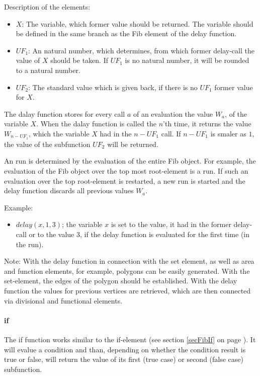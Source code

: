\bigskip\noindent
Description of the elements:
\begin{itemize}
 \item $X$: The variable, which former value should be returned. The variable should be defined in the same branch as the Fib element of the delay function.
 \item $UF_1$: An natural number, which determines, from which former delay-call the value of $X$ should be taken. If $UF_1$ is no natural number, it will be rounded to a natural number.
 \item $UF_2$: The standard value which is given back, if there is no $UF_1$ former value for $X$.
\end{itemize}
The dalay function stores for every call $a$ of an evaluation the value $W_a$, of the variable $X$. When the dalay function is called the $n$'th time, it returns the value $W_{n-UF_1}$, which the variable $X$ had in the $n-UF_1$ call. If $n-UF_1$ is smaler as $1$, the value of the subfunction $UF_2$ will be returned.

An run is determined by the evaluation of the entire Fib object. For example, the evaluation of the Fib object over the top most root-element is a run. If such an evaluation over the top root-element is restarted, a new run is started and the delay function discards all previous values $W_a$.

\bigskip\noindent
Example:
\begin{itemize}
 \item $delay(x, 1, 3)$; the variable $x$ is set to the value, it had in the former delay-call or to the value $3$, if the delay function is evaluated for the first time (in the run).
\end{itemize}

\bigskip\noindent
Note:
With the delay function in connection with the set element, as well as area and function elements, for example, polygons can be easily generated. With the set-element, the edges of the polygon should be established. With the delay function the values for previous vertices are retrieved, which are then connected via divisional and functional elements.


\paragraph{if}

The if function works similar to the if-element (see section \ref{secFibIf} on page \pageref{secFibIf}). It will evalue a condition and than, depending on whether the condition result is true or false, will return the value of its first (true case) or second (false case) subfunction.

